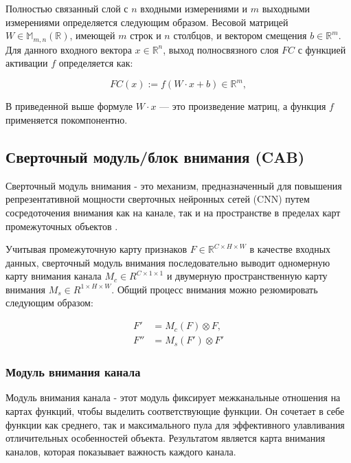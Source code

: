 Полностью связанный слой с \(n\) входными измерениями и \(m\) выходными измерениями определяется следующим образом. Весовой матрицей \(W \in \mathbb{M}_{m,n}(\mathbb{R})\), имеющей \(m\) строк и \(n\) столбцов, и вектором смещения \(b \in \mathbb{R}^{m}\). Для данного входного вектора \(x \in \mathbb{R}^{n}\), выход полносвязного слоя \(FC\) с функцией активации \(f\) определяется как:

\begin{equation}
    FC(x) := f(W \cdot x + b) \in \mathbb{R}^{m}
, \end{equation}

В приведенной выше формуле \(W \cdot x\) — это произведение матриц, а функция \(f\) применяется покомпонентно.




\subsection*{Сверточный модуль/блок внимания (CAB)}

Сверточный модуль внимания - это механизм, предназначенный для повышения репрезентативной мощности сверточных нейронных сетей (CNN) путем сосредоточения внимания как на канале, так и на пространстве в пределах карт промежуточных объектов \cite{woo2018cbam}.

Учитывая промежуточную карту признаков \(F \in \mathbb{R}^{C \times H \times W}\) в качестве входных данных, сверточный модуль внимания последовательно выводит одномерную карту внимания канала \({M}_{c} \in {R}^{C \times 1 \times 1} \) и двумерную пространственную карту внимания \( {M}_{s} \in {R}^{1 \times H \times W} \). Общий процесс внимания можно резюмировать следующим образом:

\begin{equation}
\begin{split}
	F' & = {M}_{c}(F) \otimes F, \\
	F'' & = {M}_{s}(F') \otimes F'
\end{split}
\end{equation}

\subsubsection*{Модуль внимания канала}

Модуль внимания канала - этот модуль фиксирует межканальные отношения на картах функций, чтобы выделить соответствующие функции. Он сочетает в себе функции как среднего, так и максимального пула для эффективного улавливания отличительных особенностей объекта. Результатом является карта внимания каналов, которая показывает важность каждого канала.

